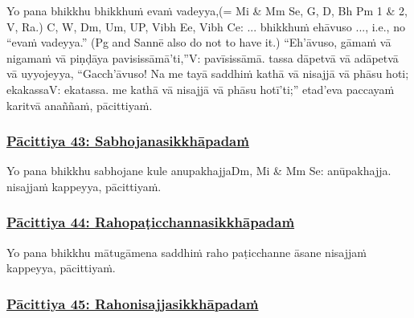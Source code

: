 Yo pana bhikkhu bhikkhuṁ evaṁ vadeyya,\makeatletter\hyperlink{endnote-appendix}\makeatother (= Mi & Mm Se, G, D, Bh Pm 1 & 2, V, Ra.) C, W, Dm, Um, UP, Vibh Ee, Vibh Ce: ... bhikkhuṁ ehāvuso ..., i.e., no “evaṁ
vadeyya.” (Pg and Sannē also do not to have it.) ``Eh'āvuso, gāmaṁ vā nigamaṁ vā piṇḍāya pavisissāmā'ti,''\makeatletter\hyperlink{endnote-appendix}\makeatother V: pavīsissāmā. tassa dāpetvā vā adāpetvā vā uyyojeyya, ``Gacch'āvuso! Na me tayā saddhiṁ kathā vā nisajjā vā phāsu hoti; ekakassa\makeatletter\hyperlink{endnote-appendix}\makeatother V: ekatassa. me kathā vā nisajjā vā phāsu hotī'ti;'' etad'eva paccayaṁ karitvā anaññaṁ, pācittiyaṁ.



\subsubsection*{\hyperref[exp43]{Pācittiya 43: Sabhojanasikkhāpadaṁ}}
\label{pac43}

Yo pana bhikkhu sabhojane kule anupakhajja\makeatletter\hyperlink{endnote-appendix}\makeatother Dm, Mi & Mm Se: anūpakhajja. nisajjaṁ kappeyya, pācittiyaṁ.



\subsubsection*{\hyperref[exp44]{Pācittiya 44: Rahopaṭicchannasikkhāpadaṁ}}
\label{pac44}

Yo pana bhikkhu mātugāmena saddhiṁ raho paṭicchanne āsane nisajjaṁ kappeyya, pācittiyaṁ.



\subsubsection*{\hyperref[exp45]{Pācittiya 45: Rahonisajjasikkhāpadaṁ}}
\label{pac45}

